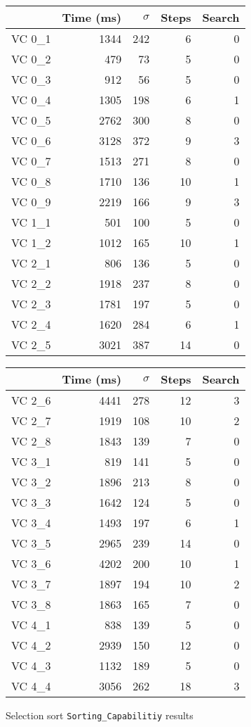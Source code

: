 \begin{figure}
	\centering
	\begin{tabular}{lrrrr}
		\toprule
			& Time (ms)	& $\sigma$& Steps & Search \\
		\midrule
		VC 0\_1	& 1344		& 242 	& 6 	& 0     \\
		VC 0\_2	& 479		& 73	& 5 	& 0     \\
		VC 0\_3	& 912		& 56	& 5 	& 0     \\
		VC 0\_4	& 1305		& 198	& 6 	& 1     \\
		VC 0\_5	& 2762		& 300	& 8	& 0     \\
		VC 0\_6	& 3128		& 372	& 9 	& 3     \\
		VC 0\_7	& 1513		& 271	& 8 	& 0     \\
		VC 0\_8	& 1710		& 136	& 10	& 1     \\
		VC 0\_9	& 2219		& 166	& 9 	& 3     \\
		VC 1\_1	& 501 		& 100	& 5 	& 0     \\
		VC 1\_2	& 1012 		& 165	& 10	& 1     \\
		VC 2\_1	& 806 		& 136	& 5 	& 0     \\
		VC 2\_2	& 1918		& 237	& 8 	& 0     \\
		VC 2\_3	& 1781		& 197	& 5 	& 0     \\
		VC 2\_4	& 1620		& 284	& 6 	& 1     \\
		VC 2\_5	& 3021		& 387	& 14	& 0     \\
		\bottomrule
	\end{tabular}
	\qquad
	\begin{tabular}{lrrrr}
		\toprule
			& Time (ms)	& $\sigma$& Steps & Search \\
		\midrule
		VC 2\_6	& 4441		& 278	& 12	& 3     \\
		VC 2\_7	& 1919		& 108	& 10	& 2     \\
		VC 2\_8	& 1843		& 139	& 7 	& 0     \\
		VC 3\_1	& 819 		& 141	& 5 	& 0     \\
		VC 3\_2	& 1896		& 213	& 8 	& 0     \\
		VC 3\_3	& 1642		& 124	& 5 	& 0     \\
		VC 3\_4	& 1493		& 197	& 6 	& 1     \\
		VC 3\_5	& 2965		& 239	& 14	& 0     \\
		VC 3\_6	& 4202		& 200	& 10	& 1     \\
		VC 3\_7	& 1897		& 194	& 10	& 2     \\
		VC 3\_8	& 1863		& 165	& 7 	& 0     \\
		VC 4\_1	& 838 		& 139	& 5 	& 0     \\
		VC 4\_2	& 2939		& 150	& 12	& 0     \\
		VC 4\_3	& 1132		& 189	& 5 	& 0     \\
		VC 4\_4	& 3056		& 262	& 18	& 3     \\
		\bottomrule
	\end{tabular}
	\caption{Selection sort \texttt{Sorting\_Capabilitiy} results\label{fig:sortingResults}}
\end{figure}

